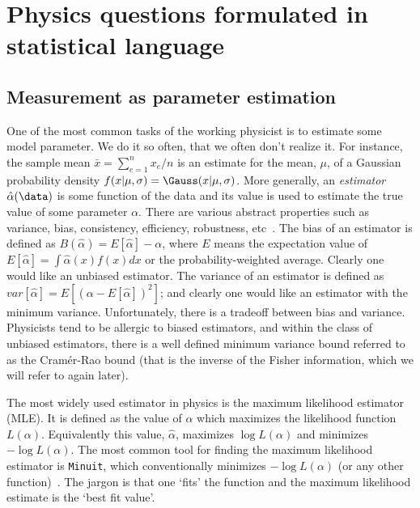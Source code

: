 \section{Physics questions formulated in statistical language}


\subsection{Measurement as parameter estimation}
\label{S:estimation} 

One of the most common tasks of the working physicist is to estimate some model parameter.  We do it so often, that we often don't realize it. For instance, the sample mean $\bar{x} = \sum_{e=1}^n x_e / n$ is an estimate for the mean, $\mu$,  of a Gaussian probability density $f(x|\mu,\sigma) =\Gauss(x|\mu,\sigma)$.  More generally, an \textit{estimator} $\hat{\alpha}(\data)$ is some function of the data and its value is used to estimate the true value of some parameter $\alpha$.  There are various abstract properties such as variance, bias, consistency, efficiency, robustness, etc~\cite{James}.  The bias of an estimator is defined as  $B(\hat\alpha) = E[ \hat\alpha ]-\alpha$, where $E$ means the expectation value of \mbox{$E[ \hat\alpha ]=\int\hat\alpha(x) f(x)dx$} or the probability-weighted average.  Clearly one would like an unbiased estimator. The variance of an estimator is defined as $var[\hat\alpha] = E[ (\alpha - E[\hat{\alpha}] )^2 ]$; and clearly one would like an estimator with the minimum variance.  Unfortunately, there is a tradeoff between bias and variance.  Physicists tend to be allergic to biased estimators, and within the class of unbiased estimators, there is a well defined minimum variance bound referred to as the Cram\'er-Rao bound (that is the inverse of the Fisher information, which we will refer to again later).  


The most widely used estimator in physics is the maximum likelihood estimator (MLE).  It is defined as the value of $\alpha$ which maximizes the likelihood function $L(\alpha)$.  Equivalently this value, $\hat{\alpha}$, maximizes $\log L(\alpha)$ and minimizes $-\log L(\alpha)$.  The most common tool for finding the maximum likelihood estimator is \texttt{Minuit}, which conventionally minimizes $-\log L(\alpha)$ (or any other function)~\cite{James:1975dr}.  The jargon is that one `fits' the function and the maximum likelihood estimate is the `best fit value'.  


